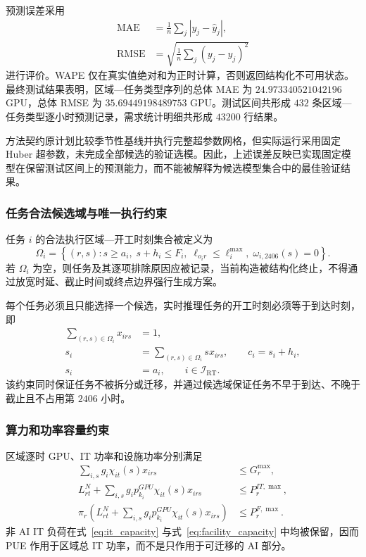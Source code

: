 预测误差采用
\begin{align}
\mathrm{MAE}&=\frac{1}{n}\sum_j|y_j-\widehat y_j|,\\
\mathrm{RMSE}&=\sqrt{\frac{1}{n}\sum_j(y_j-\widehat y_j)^2}
\end{align}
进行评价。WAPE 仅在真实值绝对和为正时计算，否则返回结构化不可用状态。最终测试结果表明，区域—任务类型序列的总体 MAE 为 $24.973340521042196$ GPU，总体 RMSE 为 $35.69449198489753$ GPU。测试区间共形成 $432$ 条区域—任务类型逐小时预测记录，需求统计明细共形成 $43200$ 行结果。

方法契约原计划比较季节性基线并执行完整超参数网格，但实际运行采用固定 Huber 超参数，未完成全部候选的验证选模。因此，上述误差反映已实现固定模型在保留测试区间上的预测能力，而不能被解释为候选模型集合中的最佳验证结果。

\subsubsection{任务合法候选域与唯一执行约束}

任务 $i$ 的合法执行区域—开工时刻集合被定义为
\begin{equation}
\Omega_i=\left\{(r,s):
s\ge a_i,\;
s+h_i\le F_i,\;
\ell_{o_ir}\le\ell_i^{\max},\;
\omega_{i,2406}(s)=0
\right\}.
\label{eq:candidate_domain}
\end{equation}
若 $\Omega_i$ 为空，则任务及其逐项排除原因应被记录，当前构造被结构化终止，不得通过放宽时延、截止时间或终点边界强行生成方案。

每个任务必须且只能选择一个候选，实时推理任务的开工时刻必须等于到达时刻，即
\begin{align}
\sum_{(r,s)\in\Omega_i}x_{irs}&=1,\\
s_i&=\sum_{(r,s)\in\Omega_i}sx_{irs},\qquad c_i=s_i+h_i,\\
s_i&=a_i,\qquad i\in\mathcal I_{\mathrm{RT}}.
\end{align}
该约束同时保证任务不被拆分或迁移，并通过候选域保证任务不早于到达、不晚于截止且不占用第 $2406$ 小时。

\subsubsection{算力和功率容量约束}

区域逐时 GPU、IT 功率和设施功率分别满足
\begin{align}
\sum_{i,s}g_i\chi_{it}(s)x_{irs}
&\le G_r^{\max}, \label{eq:gpu_capacity}\\
L_{rt}^{N}+\sum_{i,s}g_ip_{k_i}^{GPU}\chi_{it}(s)x_{irs}
&\le P_r^{IT,\max}, \label{eq:it_capacity}\\
\pi_r\left(
L_{rt}^{N}+\sum_{i,s}g_ip_{k_i}^{GPU}\chi_{it}(s)x_{irs}
\right)&\le P_r^{F,\max}. \label{eq:facility_capacity}
\end{align}
非 AI IT 负荷在式~\eqref{eq:it_capacity} 与式~\eqref{eq:facility_capacity} 中均被保留，因而 PUE 作用于区域总 IT 功率，而不是只作用于可迁移的 AI 部分。

